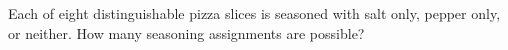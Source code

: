 Each of eight distinguishable pizza slices is seasoned with salt only, pepper only, or neither. How many seasoning assignments are possible?
